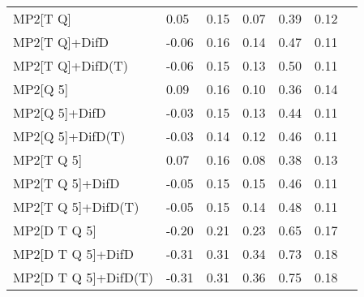 \begin{table}
\begin{tabular}{l l l l l l l }
    MP2[T Q] & 0.05 & 0.15 & 0.07 & 0.39 & 0.12 \\ 
    MP2[T Q]+DifD & -0.06 & 0.16 & 0.14 & 0.47 & 0.11 \\ 
    MP2[T Q]+DifD(T) & -0.06 & 0.15 & 0.13 & 0.50 & 0.11 \\ 
    MP2[Q 5] & 0.09 & 0.16 & 0.10 & 0.36 & 0.14 \\ 
    MP2[Q 5]+DifD & -0.03 & 0.15 & 0.13 & 0.44 & 0.11 \\ 
    MP2[Q 5]+DifD(T) & -0.03 & 0.14 & 0.12 & 0.46 & 0.11 \\ 
    MP2[T Q 5] & 0.07 & 0.16 & 0.08 & 0.38 & 0.13 \\ 
    MP2[T Q 5]+DifD & -0.05 & 0.15 & 0.15 & 0.46 & 0.11 \\ 
    MP2[T Q 5]+DifD(T) & -0.05 & 0.15 & 0.14 & 0.48 & 0.11 \\ 
    MP2[D T Q 5] & -0.20 & 0.21 & 0.23 & 0.65 & 0.17 \\ 
    MP2[D T Q 5]+DifD & -0.31 & 0.31 & 0.34 & 0.73 & 0.18 \\ 
    MP2[D T Q 5]+DifD(T) & -0.31 & 0.31 & 0.36 & 0.75 & 0.18 \\ 
    \bottomrule
  \end{tabular}
\end{table}

